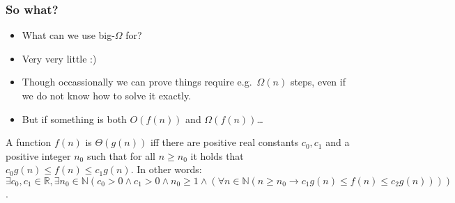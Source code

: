 \begin{frame}
	\frametitle{So what?}
	\begin{itemize}
	\item What can we use big-$\Omega$ for?

	\item Very very little :)
		
	\item Though occassionally we can prove things require e.g.\ $\Omega(n)$ steps, even if we do not know how to solve it
		exactly.
		
	\item But if something is both $O(f(n))$ and $\Omega(f(n))$\dots
	\end{itemize}
	
	\begin{definition}
		A function $f(n)$ is $\Theta(g(n))$ iff there are positive real constants $c_0, c_1$ and a positive integer $n_0$ such that for
		all $n \geq n_0$ it holds that $c_0 g(n) \leq f(n) \leq c_1 g(n)$. In other words:\\
		{\small
		$\exists c_0,c_1 \in \mathbb{R}, \exists n_0 \in \mathbb{N} (c_0> 0 \wedge c_1 > 0\wedge n_0 \geq 1 \wedge (\forall
		n \in \mathbb{N} (n \geq n_0 \to c_1 g(n) \leq f(n) \leq c_2 g(n))))$.
	}
	\end{definition}
\end{frame}

